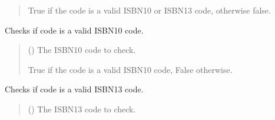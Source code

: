 \documentclass[letterpaper,10pt,english]{sphinxmanual}
\begin{document}
\begin{fulllineitems}
\begin{fulllineitems}
\begin{quote}
\begin{description}
\sphinxAtStartPar
True if the code is a valid ISBN\sphinxhyphen{}10 or ISBN\sphinxhyphen{}13 code, otherwise false.

\end{description}\end{quote}

\end{fulllineitems}


\begin{fulllineitems}
\label{\detokenize{apache_commons_validator_python.routines:apache_commons_validator_python.routines.isbn_validator.ISBNValidator.is_valid_isbn10}}
\pysigstartsignatures
{}
\pysigstopsignatures
\sphinxAtStartPar
Checks if code is a valid ISBN\sphinxhyphen{}10 code.
\begin{quote}\begin{description}
\sphinxAtStartPar
{} () \textendash{} The ISBN\sphinxhyphen{}10 code to check.

\sphinxAtStartPar
True if the code is a valid ISBN\sphinxhyphen{}10 code, False otherwise.

\end{description}\end{quote}

\end{fulllineitems}


\begin{fulllineitems}
\label{\detokenize{apache_commons_validator_python.routines:apache_commons_validator_python.routines.isbn_validator.ISBNValidator.is_valid_isbn13}}
\pysigstartsignatures
{}
\pysigstopsignatures
\sphinxAtStartPar
Checks if code is a valid ISBN\sphinxhyphen{}13 code.
\begin{quote}\begin{description}
\sphinxAtStartPar
{} () \textendash{} The ISBN\sphinxhyphen{}13 code to check.


\end{description}
\end{quote}
\end{fulllineitems}
\end{fulllineitems}
\end{document}
